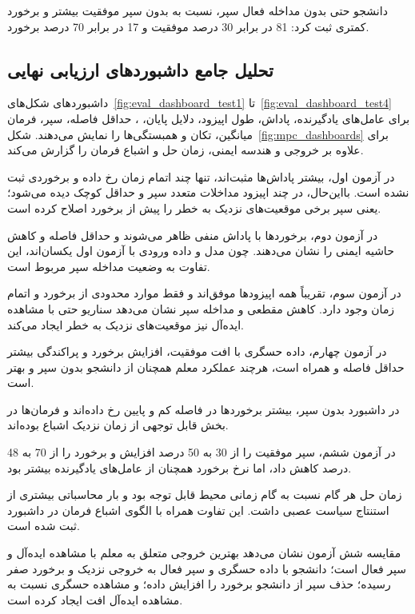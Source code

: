 دانشجو حتی بدون مداخله فعال سپر، نسبت به  بدون سپر موفقیت بیشتر و برخورد کمتری ثبت کرد: 81 در برابر 30 درصد موفقیت و 17 در برابر 70 درصد برخورد.

\subsection{تحلیل جامع داشبوردهای ارزیابی نهایی}
\label{subsec:final_eval_dashboard_analysis}

داشبوردهای شکل‌های~\ref{fig:eval_dashboard_test1} تا~\ref{fig:eval_dashboard_test4} برای عامل‌های یادگیرنده، پاداش، طول اپیزود، دلایل پایان، ، حداقل فاصله، سپر، فرمان میانگین، تکان و همبستگی‌ها را نمایش می‌دهند. شکل~\ref{fig:mpc_dashboards} برای  علاوه بر خروجی و هندسه ایمنی، زمان حل و اشباع فرمان را گزارش می‌کند.

در آزمون اول، بیشتر پاداش‌ها مثبت‌اند، تنها چند اتمام زمان رخ داده و برخوردی ثبت نشده است. بااین‌حال، در چند اپیزود مداخلات متعدد سپر و حداقل  کوچک دیده می‌شود؛ یعنی سپر برخی موقعیت‌های نزدیک به خطر را پیش از برخورد اصلاح کرده است.

در آزمون دوم، برخوردها با پاداش منفی ظاهر می‌شوند و حداقل فاصله و  کاهش حاشیه ایمنی را نشان می‌دهند. چون مدل و داده ورودی با آزمون اول یکسان‌اند، این تفاوت به وضعیت مداخله سپر مربوط است.

در آزمون سوم، تقریباً همه اپیزودها موفق‌اند و فقط موارد محدودی از برخورد و اتمام زمان وجود دارد. کاهش مقطعی  و مداخله سپر نشان می‌دهد سناریو حتی با مشاهده ایده‌آل نیز موقعیت‌های نزدیک به خطر ایجاد می‌کند.

در آزمون چهارم، داده حسگری با افت موفقیت، افزایش برخورد و پراکندگی بیشتر حداقل فاصله و  همراه است، هرچند عملکرد معلم همچنان از دانشجو بدون سپر و  بهتر است.

در داشبورد  بدون سپر، بیشتر برخوردها در فاصله کم و  پایین رخ داده‌اند و فرمان‌ها در بخش قابل توجهی از زمان نزدیک اشباع بوده‌اند.

در آزمون ششم، سپر موفقیت  را از 30 به 50 درصد افزایش و برخورد را از 70 به 48 درصد کاهش داد، اما نرخ برخورد همچنان از عامل‌های یادگیرنده بیشتر بود.

زمان حل هر گام  نسبت به گام زمانی محیط قابل توجه بود و بار محاسباتی بیشتری از استنتاج سیاست عصبی داشت. این تفاوت همراه با الگوی اشباع فرمان در داشبورد ثبت شده است.

مقایسه شش آزمون نشان می‌دهد بهترین خروجی متعلق به معلم با مشاهده ایده‌آل و سپر فعال است؛ دانشجو با داده حسگری و سپر فعال به خروجی نزدیک و برخورد صفر رسیده؛ حذف سپر از دانشجو برخورد را افزایش داده؛ و مشاهده حسگری نسبت به مشاهده ایده‌آل افت ایجاد کرده است.

